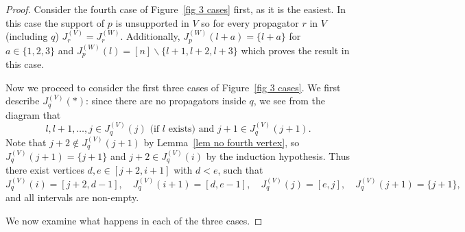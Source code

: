 \documentclass[11pt]{article}
\theoremstyle{remark}
\theoremstyle{definition}
\begin{document}
\begin{proof}
Consider the fourth case of Figure~\ref{fig 3 cases} first, as it is the easiest.  In this case the support of $p$ is unsupported in $V$ so for every propagator $r$ in $V$ (including $q$) $J_r^{(V)} = J_r^{(W)}$.  Additionally, $J_p^{(W)}(l+a) = \{l+a\}$ for $a\in\{1,2,3\}$ and $J_p^{(W)}(l) = [n] \backslash \{l+1, l+2, l+3\}$ which proves the result in this case.


Now we proceed to consider the first three cases of Figure~\ref{fig 3 cases}.
We first describe $J_q^{(V)}(*)$: since there are no propagators inside $q$, we see from the diagram that
\[l, l+1, \ldots ,j \in J^{(V)}_q(j) \text{ (if $l$ exists) and }  j+1 \in J^{(V)}_q(j+1).\]
Note that $j+2 \not\in J^{(V)}_q(j+1)$ by Lemma~\ref{lem no fourth vertex}, so $J^{(V)}_q(j+1) = \{j+1\}$ and $j+2 \in J^{(V)}_q(i)$ by the induction hypothesis. Thus there exist vertices $d,e \in [j+2,i+1]$ with $d <e$, such that
\[J^{(V)}_q(i) = [j+2,d-1], \quad J^{(V)}_q(i+1) = [d,e-1], \quad J^{(V)}_q(j) = [e,j], \quad J^{(V)}_q(j+1) = \{j+1\},\]
and all intervals are non-empty.




We now examine what happens in each of the three cases.



\end{proof}
\end{document}
